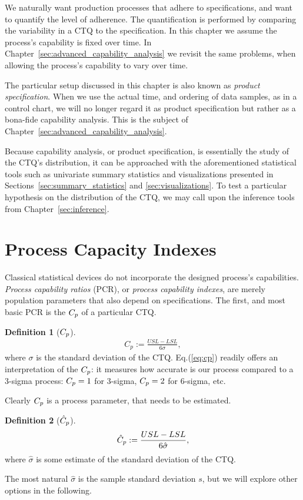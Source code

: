\documentclass[12pt,a4paper]{report}
\theoremstyle{plain}
\theoremstyle{definition}
\newtheorem{definition}{Definition}
\begin{document}
We naturally want production processes that adhere to specifications, and want to quantify the level of adherence.
The quantification is performed by comparing the variability in a CTQ to the specification.
In this chapter we assume the process’s capability is fixed over time. 
In Chapter~\ref{sec:advanced_capability_analysis} we revisit the same problems, when allowing the process’s capability to vary over time. 

The particular setup discussed in this chapter is also known as \emph{product specification}.
When we use the actual time, and ordering of data samples, as in a control chart, we will no longer regard it as product specification but rather as a bona-fide capability analysis. This is the subject of Chapter~\ref{sec:advanced_capability_analysis}.



 
 
 
Because capability analysis, or product specification, is essentially the study of the CTQ's distribution, it can be approached with the aforementioned statistical tools such as univariate summary statistics and visualizations presented in Sections~\ref{sec:summary_statistics} and \ref{sec:visualizations}.
To test a particular hypothesis on the distribution of the CTQ, we may call upon the inference tools from Chapter~\ref{sec:inference}.




\section{Process Capacity Indexes}

Classical statistical devices do not incorporate the designed process's capabilities.
\emph{Process capability ratios} (PCR), or \emph{process capability indexes}, are merely population parameters that also depend on specifications.
The first, and most basic PCR is the $C_p$ of a particular CTQ.

\begin{definition}[$C_p$]
\begin{align}
\label{eq:cp}
	C_p:= \frac{USL-LSL}{6 \sigma}, 
\end{align}
where $\sigma$ is the standard deviation of the CTQ.
Eq.(\ref{eq:cp}) readily offers an interpretation of the $C_p$: it measures how accurate is our process compared to a 3-sigma process: $C_p=1$ for 3-sigma, $C_p=2$ for 6-sigma, etc.
\end{definition}
Clearly $C_p$ is a process parameter, that needs to be estimated.
\begin{definition}[$\hat{C}_p$]
\begin{align}
	\hat{C}_p:= \frac{USL-LSL}{6 \hat{\sigma}}, 
\end{align}
where $\hat{\sigma}$ is some estimate of the standard deviation of the CTQ.
\end{definition}
The most natural $\hat{\sigma}$ is the sample standard deviation $s$, but we will explore other options in the following.
\end{document}

